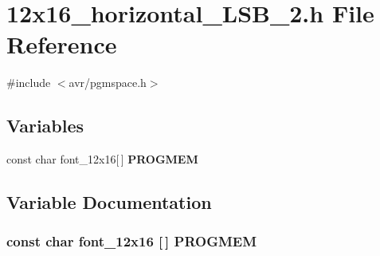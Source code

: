 \section{12x16\_\-horizontal\_\-LSB\_\-2.h File Reference}
\label{12x16__horizontal__LSB__2_8h}
{\ttfamily \#include $<$avr/pgmspace.h$>$}\par
\subsection*{Variables}
\begin{DoxyCompactItemize}
\item 
const char font\_\-12x16[$\,$] {\bf PROGMEM}
\end{DoxyCompactItemize}


\subsection{Variable Documentation}
\subsubsection[{PROGMEM}]{\setlength{\rightskip}{0pt plus 5cm}const char font\_\-12x16 [$\,$] {\bf PROGMEM}}\label{12x16__horizontal__LSB__2_8h_a3be0ed5f5cfb107eadc59d0b6b3771af}
